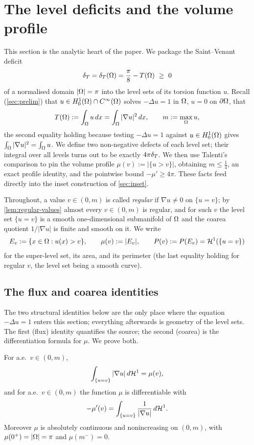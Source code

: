 \section{The level deficits and the volume profile}\label{sec:identity}

This section is the analytic heart of the paper. We package the Saint--Venant
deficit
\[
   \delta_T=\delta_T(\Omega)=\frac\pi8-T(\Omega)\ \ge\ 0
\]
of a normalised domain $|\Omega|=\pi$ into the level sets of its torsion
function $u$. Recall (\cref{sec:prelim}) that $u\in H^1_0(\Omega)\cap
C^\infty(\Omega)$ solves $-\Delta u=1$ in $\Omega$, $u=0$ on $\partial\Omega$, that
\[
   T(\Omega):=\int_\Omega u\,dx=\int_\Omega|\nabla u|^2\,dx,
   \qquad m:=\max_\Omega u ,
\]
the second equality holding because testing $-\Delta u=1$ against
$u\in H^1_0(\Omega)$ gives $\int_\Omega|\nabla u|^2=\int_\Omega u$. We define two
non-negative defects of each level set; their integral over all levels turns
out to be exactly $4\pi\delta_T$. We then use Talenti's comparison to pin the
volume profile $\mu(v):=|\{u>v\}|$, obtaining $m\le\tfrac14$, an exact
profile identity, and the pointwise bound $-\mu'\ge4\pi$. These facts feed
directly into the inset construction of \cref{sec:inset}.

Throughout, a value $v\in(0,m)$ is called \emph{regular} if $\nabla u\ne0$ on
$\{u=v\}$; by \cref{lem:regular-values} almost every $v\in(0,m)$ is regular,
and for such $v$ the level set $\{u=v\}$ is a smooth one-dimensional
submanifold of $\Omega$ and the coarea quotient $1/|\nabla u|$ is finite and
smooth on it. We write
\[
   E_v:=\{x\in\Omega:u(x)>v\},\qquad
   \mu(v):=|E_v|,\qquad
   P(v):=P(E_v)=\mathcal{H}^1(\{u=v\})
\]
for the super-level set, its area, and its perimeter (the last equality
holding for regular $v$, the level set being a smooth curve).

\subsection{The flux and coarea identities}

The two structural identities below are the only place where the equation
$-\Delta u=1$ enters this section; everything afterwards is geometry of the
level sets. The first (flux) identity quantifies the source; the second
(coarea) is the differentiation formula for $\mu$. We prove both.

\begin{lemma}\label{lem:flux}
For a.e.\ $v\in(0,m)$,
\begin{equation}\label{eq:flux}
   \int_{\{u=v\}}|\nabla u|\,d\mathcal{H}^1=\mu(v),
\end{equation}
and for a.e.\ $v\in(0,m)$ the function $\mu$ is differentiable with
\begin{equation}\label{eq:coarea}
   -\mu'(v)=\int_{\{u=v\}}\frac{1}{|\nabla u|}\,d\mathcal{H}^1 .
\end{equation}
Moreover $\mu$ is absolutely continuous and nonincreasing on $(0,m)$, with
$\mu(0^+)=|\Omega|=\pi$ and $\mu(m^-)=0$.
\end{lemma}

